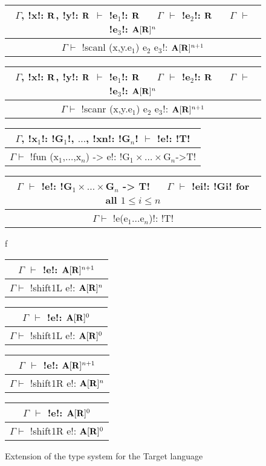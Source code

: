 \begin{figure*}[tb]
    \centering

    \begin{tabular}{c}
        $\Gamma$, !x!: $\mathbf{R}$, !y!: $\mathbf{R}$ $\vdash$ !e$_1$!: $\mathbf{R}$ 
        $\quad$ $\Gamma$ $\vdash$ !e$_2$!: $\mathbf{R}$
        $\quad$ $\Gamma$ $\vdash$ !e$_3$!: $\mathbf{A}[\mathbf{R}]^{n}$
        \\\hline  
        $\Gamma \vdash$ !scanl (x,y.e$_1$) e$_2$ e$_3$!: $\mathbf{A}[\mathbf{R}]^{n+1}$
    \end{tabular}

    \begin{tabular}{c}
        $\Gamma$, !x!: $\mathbf{R}$, !y!: $\mathbf{R}$ $\vdash$ !e$_1$!: $\mathbf{R}$ 
        $\quad$ $\Gamma$ $\vdash$ !e$_2$!: $\mathbf{R}$
        $\quad$ $\Gamma$ $\vdash$ !e$_3$!: $\mathbf{A}[\mathbf{R}]^{n}$
        \\\hline  
        $\Gamma \vdash$ !scanr (x,y.e$_1$) e$_2$ e$_3$!: $\mathbf{A}[\mathbf{R}]^{n+1}$
    \end{tabular}

    \begin{tabular}{c}
        $\Gamma$, !x$_1$!: !G$_1$!, $\ldots$, !xn!: !G$_n$! $\vdash$ !e!: !T! 
        \\\hline  
        $\Gamma \vdash$ !fun (x$_1$,$\ldots$,x$_n$) -> e!: !G$_1\times\ldots\times$G$_n$->T!
    \end{tabular}

    \begin{tabular}{c}
        $\Gamma$ $\vdash$ !e!: !G$_1\times\ldots\times$G$_n$ -> T!
        $\quad$ $\Gamma$ $\vdash$ !ei!: !Gi! for all $1\leq i\leq n$
        \\\hline  
        $\Gamma \vdash$ !e(e$_1\ldots$e$_n$)!: !T!
    \end{tabular}f

    \begin{tabular}{c}
        $\Gamma$ $\vdash$ !e!: $\mathbf{A}[\mathbf{R}]^{n+1}$
        \\\hline  
        $\Gamma \vdash$ !shift1L e!: $\mathbf{A}[\mathbf{R}]^{n}$
    \end{tabular}
    \hspace{0.5cm}
    \begin{tabular}{c}
        $\Gamma$ $\vdash$ !e!: $\mathbf{A}[\mathbf{R}]^{0}$
        \\\hline  
        $\Gamma \vdash$ !shift1L e!: $\mathbf{A}[\mathbf{R}]^{0}$
    \end{tabular}

    \begin{tabular}{c}
        $\Gamma$ $\vdash$ !e!: $\mathbf{A}[\mathbf{R}]^{n+1}$
        \\\hline  
        $\Gamma \vdash$ !shift1R e!: $\mathbf{A}[\mathbf{R}]^{n}$
    \end{tabular}
    \hspace{0.5cm}
    \begin{tabular}{c}
        $\Gamma$ $\vdash$ !e!: $\mathbf{A}[\mathbf{R}]^{0}$
        \\\hline  
        $\Gamma \vdash$ !shift1R e!: $\mathbf{A}[\mathbf{R}]^{0}$
    \end{tabular}

    \vspace{-0.2cm}
    \caption{Extension of the type system for the Target language}
    \vspace{-0.4cm}
    \label{fig:target_typesystem}
    \end{figure*}
